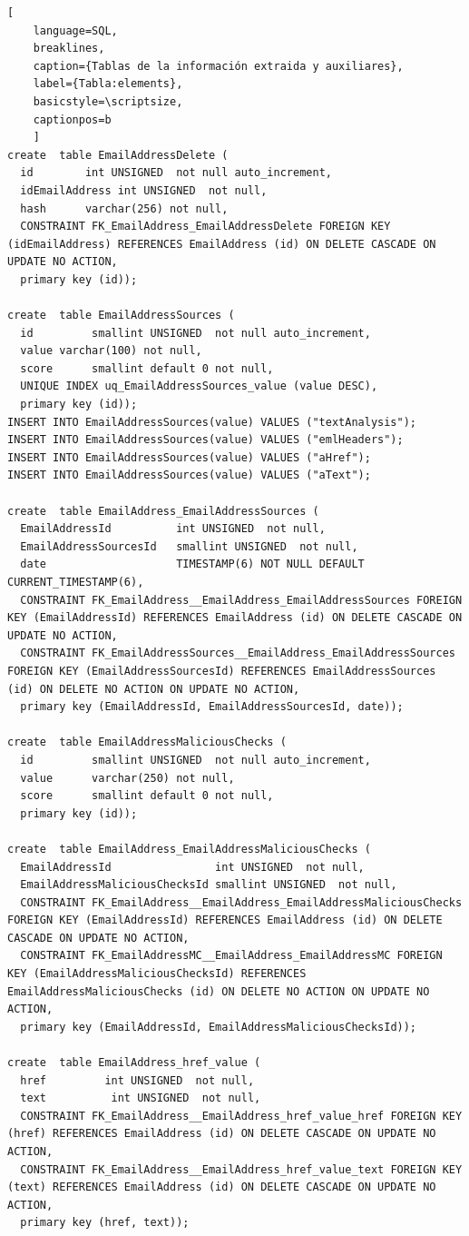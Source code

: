 \begin{lstlisting}[
    language=SQL,
    breaklines, 
    caption={Tablas de la información extraida y auxiliares}, 
    label={Tabla:elements}, 
    basicstyle=\scriptsize,
    captionpos=b
    ]
create  table EmailAddressDelete (
  id        int UNSIGNED  not null auto_increment, 
  idEmailAddress int UNSIGNED  not null, 
  hash      varchar(256) not null, 
  CONSTRAINT FK_EmailAddress_EmailAddressDelete FOREIGN KEY (idEmailAddress) REFERENCES EmailAddress (id) ON DELETE CASCADE ON UPDATE NO ACTION,
  primary key (id));

create  table EmailAddressSources (
  id         smallint UNSIGNED  not null auto_increment, 
  value varchar(100) not null, 
  score      smallint default 0 not null, 
  UNIQUE INDEX uq_EmailAddressSources_value (value DESC),
  primary key (id));
INSERT INTO EmailAddressSources(value) VALUES ("textAnalysis");
INSERT INTO EmailAddressSources(value) VALUES ("emlHeaders");
INSERT INTO EmailAddressSources(value) VALUES ("aHref");
INSERT INTO EmailAddressSources(value) VALUES ("aText");

create  table EmailAddress_EmailAddressSources (
  EmailAddressId          int UNSIGNED  not null, 
  EmailAddressSourcesId   smallint UNSIGNED  not null,
  date                    TIMESTAMP(6) NOT NULL DEFAULT CURRENT_TIMESTAMP(6),
  CONSTRAINT FK_EmailAddress__EmailAddress_EmailAddressSources FOREIGN KEY (EmailAddressId) REFERENCES EmailAddress (id) ON DELETE CASCADE ON UPDATE NO ACTION,
  CONSTRAINT FK_EmailAddressSources__EmailAddress_EmailAddressSources FOREIGN KEY (EmailAddressSourcesId) REFERENCES EmailAddressSources (id) ON DELETE NO ACTION ON UPDATE NO ACTION,
  primary key (EmailAddressId, EmailAddressSourcesId, date));

create  table EmailAddressMaliciousChecks (
  id         smallint UNSIGNED  not null auto_increment, 
  value      varchar(250) not null, 
  score      smallint default 0 not null, 
  primary key (id));

create  table EmailAddress_EmailAddressMaliciousChecks (
  EmailAddressId                int UNSIGNED  not null, 
  EmailAddressMaliciousChecksId smallint UNSIGNED  not null,
  CONSTRAINT FK_EmailAddress__EmailAddress_EmailAddressMaliciousChecks FOREIGN KEY (EmailAddressId) REFERENCES EmailAddress (id) ON DELETE CASCADE ON UPDATE NO ACTION,
  CONSTRAINT FK_EmailAddressMC__EmailAddress_EmailAddressMC FOREIGN KEY (EmailAddressMaliciousChecksId) REFERENCES EmailAddressMaliciousChecks (id) ON DELETE NO ACTION ON UPDATE NO ACTION,
  primary key (EmailAddressId, EmailAddressMaliciousChecksId));
  
create  table EmailAddress_href_value (
  href         int UNSIGNED  not null, 
  text          int UNSIGNED  not null, 
  CONSTRAINT FK_EmailAddress__EmailAddress_href_value_href FOREIGN KEY (href) REFERENCES EmailAddress (id) ON DELETE CASCADE ON UPDATE NO ACTION,
  CONSTRAINT FK_EmailAddress__EmailAddress_href_value_text FOREIGN KEY (text) REFERENCES EmailAddress (id) ON DELETE CASCADE ON UPDATE NO ACTION,
  primary key (href, text));





\end{lstlisting}
